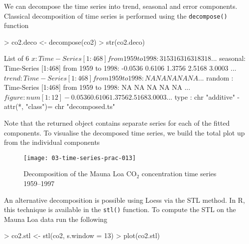 \documentclass[a4paper,10pt]{article}
\newcommand{\R}{\textsf{R}\xspace}
\begin{document}
We can decompose the time series into trend, seasonal and error components. Classical decomposition of time series is performed using the \texttt{decompose()} function
\begin{Schunk}
\begin{Sinput}
> co2.deco <- decompose(co2)
> str(co2.deco)
\end{Sinput}
\begin{Soutput}
List of 6
 $ x       : Time-Series [1:468] from 1959 to 1998: 315 316 316 318 318 ...
 $ seasonal: Time-Series [1:468] from 1959 to 1998: -0.0536 0.6106 1.3756 2.5168 3.0003 ...
 $ trend   : Time-Series [1:468] from 1959 to 1998: NA NA NA NA NA ...
 $ random  : Time-Series [1:468] from 1959 to 1998: NA NA NA NA NA ...
 $ figure  : num [1:12] -0.0536 0.6106 1.3756 2.5168 3.0003 ...
 $ type    : chr "additive"
 - attr(*, "class")= chr "decomposed.ts"
\end{Soutput}
\end{Schunk}
Note that the returned object contains separate series for each of the fitted components. To visualise the decomposed time series, we build the total plot up from the individual components
\begin{Schunk}
\end{Schunk}

\begin{figure}[t]
\begin{center}
\texttt{[image: 03-time-series-prac-013]}
\caption{Decomposition of the Mauna Loa $\mathrm{CO_2}$ concentration time series 1959--1997}
\end{center}
\end{figure}

An alternative decomposition is possible using Loess via the STL method. In \R, this technique is available in the \texttt{stl()} function. To compute the STL on the Mauna Loa data run the following
\begin{Schunk}
\begin{Sinput}
> co2.stl <- stl(co2, s.window = 13)
> plot(co2.stl)
\end{Sinput}
\end{Schunk}
\end{document}
